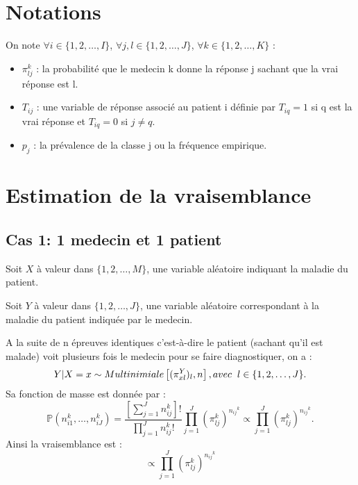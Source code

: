 \documentclass[a4paper,french,10pt]{article}
\begin{document}
	
	\section{Notations}
	
	On note $\forall i \in \{1, 2, \dots,I\}$, $\forall j, l \in \{1, 2, \dots,J\}$, $\forall k \in \{1, 2, \dots,K\}$ : \\
	
	\begin{itemize}
		\item $\pi_{lj}^k$ : la probabilité que le medecin k donne la réponse j sachant que la vrai réponse est l.
		\item $T_{ij}$ : une variable de réponse associé au patient i définie par $T_{iq} = 1$  si q est la vrai réponse et $T_{iq} = 0$ si $j \neq q$.
		\item $p_j$ : la prévalence de la classe j ou la fréquence empirique.
		
	\end{itemize}
	
%	
	

	\section{Estimation de la vraisemblance}
	\subsection{Cas 1: 1 medecin et 1 patient}
	
	Soit $X$ à valeur dans $\{1, 2, \dots ,M\}$, une variable aléatoire indiquant la maladie du patient.
	
	Soit $Y$ à valeur dans $\{1, 2, \dots ,J\}$, une variable aléatoire correspondant à la maladie du patient indiquée par le medecin.
	
	A la suite de n épreuves identiques c'est-à-dire le patient (sachant qu'il est malade) voit plusieurs fois le medecin pour se faire diagnostiquer, on a :
	\[Y | X=x \sim Multinimiale \left[(\pi_{xl}^Y)_{l}, n\right], avec\hspace{2mm}l \in \{1, 2, \dots,J\} .\]
	Sa fonction de masse est donnée par : \[\mathbb{P}\left(n_{i1}^k, \dots, n_{iJ}^k\right) = \frac{\left[\sum_{j=1}^{J} n_{ij}^k\right]!}{\prod_{j=1}^{J} n_{ij}^k !} \prod_{j=1}^{J} \left(\pi_{lj}^k\right)^{{n_{ij}}^{k}} \propto \prod_{j=1}^{J} \left(\pi_{lj}^k\right)^{{n_{ij}}^{k}}.\]
	Ainsi la vraisemblance est : \[\propto \prod_{j=1}^{J} \left(\pi_{lj}^k\right)^{{n_{ij}}^{k}}\]
	
\end{document}

